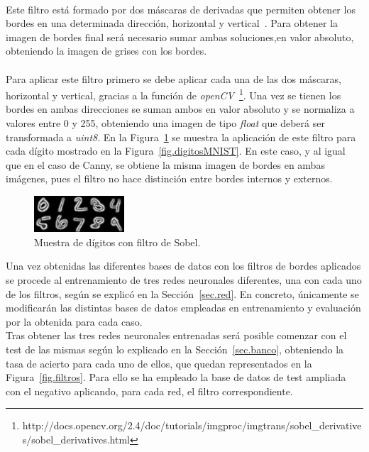 \begin{description}
	\vspace{5pt}
	\\
	Este filtro está formado por dos máscaras de derivadas  que permiten obtener los bordes en una determinada dirección, horizontal y vertical~\cite{sobel}. Para obtener la imagen de bordes final será necesario sumar ambas soluciones,en valor absoluto, obteniendo la imagen de grises con los bordes.\\
	\vspace{-10pt}
	\\
	Para aplicar este filtro primero se debe aplicar cada una de las dos máscaras, horizontal y vertical, gracias a la función de \textit{openCV}~\footnote{http://docs.opencv.org/2.4/doc/tutorials/imgproc/imgtrans/sobel\_derivatives/sobel\_derivatives.html}. Una vez se tienen los bordes en ambas direcciones se suman ambos en valor absoluto y se normaliza a valores entre 0 y 255, obteniendo una imagen de tipo \textit{float} que deberá ser transformada a \textit{uint8}. En la Figura~\ref{fig.sobel} se muestra la aplicación de este filtro para cada dígito mostrado en la Figura~\ref{fig.digitosMNIST}. En este caso, y al igual que en el caso de Canny, se obtiene la misma imagen de bordes en ambas imágenes, pues el filtro no hace distinción entre bordes internos y externos.
	
	\begin{figure}[H]
		\begin{center}
			\includegraphics[width=0.3\textwidth]{figures/sobel}
			\caption{Muestra de dígitos con filtro de Sobel.}
			\label{fig.sobel}
		\end{center}
	\end{figure}	
\end{description}
\vspace{-10pt}

Una vez obtenidas las diferentes bases de datos con los filtros de bordes aplicados se procede al entrenamiento de tres redes neuronales diferentes, una con cada uno de los filtros, según se explicó en la Sección~\ref{sec.red}. En concreto, únicamente se modificarán las distintas bases de datos empleadas en entrenamiento y evaluación por la obtenida para cada caso.\\

Tras obtener las tres redes neuronales entrenadas será posible comenzar con el test de las mismas según lo explicado en la Sección~\ref{sec.banco}, obteniendo la tasa de acierto para cada uno de ellos, que quedan representados en la Figura~\ref{fig.filtros}. Para ello se ha empleado la base de datos de test ampliada con el negativo aplicando, para cada red, el filtro correspondiente.

